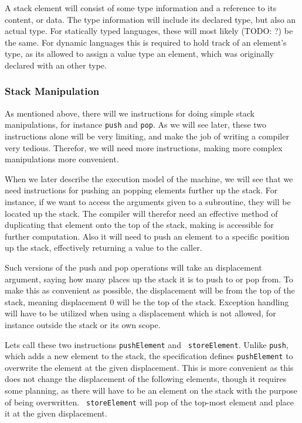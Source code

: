 A stack element will consist of some type information and a reference to its
content, or data. The type information will include its declared type, but also
an actual type. For statically typed languages, these will most likely (TODO: ?)
be the same. For dynamic languages this is required to hold track of an
element's type, as its allowed to assign a value type an element, which was
originally declared with an other type.

\subsubsection{Stack Manipulation}
As mentioned above, there will we instructions for doing simple stack
manipulations, for instance {\tt push} and {\tt pop}. As we will see later,
these two instructions alone will be very limiting, and make the job of writing
a compiler very tedious. Therefor, we will need more instructions, making more
complex manipulations more convenient.

When we later describe the execution model of the machine, we will see that we
need instructions for pushing an popping elements further up the stack. For
instance, if we want to access the arguments given to a subroutine, they will be
located up the stack. The compiler will therefor need an effective method of
duplicating that element onto the top of the stack, making is accessible for
further computation. Also it will need to push an element to a specific position
up the stack, effectively returning a value to the caller.

Such versions of the push and pop operations will take an displacement argument,
saying how many places up the stack it is to push to or pop from. To make this
as convenient as possible, the displacement will be from the top of the stack,
meaning displacement 0 will be the top of the stack. Exception handling will
have to be utilized when using a displacement which is not allowed, for instance
outside the stack or its own scope.

Lets call these two instructions {\tt pushElement} and {\tt
  storeElement}. Unlike {\tt push}, which adds a new element to the stack, the
specification defines {\tt pushElement} to overwrite the element at the given
displacement. This is more convenient as this does not change the displacement
of the following elements, though it requires some planning, as there will have
to be an element on the stack with the purpose of being overwritten. {\tt
  storeElement} will pop of the top-most element and place it at the given
displacement.

